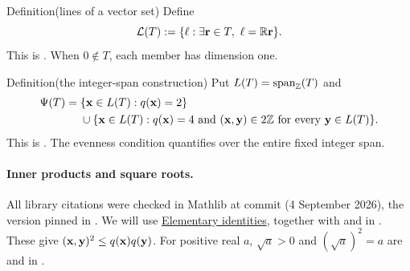 \begin{mergedproofsection}
\begin{namedresult}{Definition}{(lines of a vector set)}\label{def:312-root-lines}
Define
\[
 \cL(T):=\{\ell:\exists\Zr\in T,\ \ell=\re\Zr\}.
\]
This is . When $0\notin T$, each member
has dimension one.
\end{namedresult}

\begin{namedresult}{Definition}{(the integer-span construction)}\label{def:312-integral-roots}
\uses{}
Put $L(T)=\mathop{\mathrm{span}}\nolimits_{{\mathbb Z}}(T)$ and
\[
\begin{split}
 \Psi(T)={}&\{{\mathbf x}\in L(T):q({\mathbf x})=2\}\\
 &{}\cup\{{\mathbf x}\in L(T):q({\mathbf x})=4\text{ and }
                  ({\mathbf x},{\mathbf y})\in2{\mathbb Z}\text{ for every }{\mathbf y}\in L(T)\}.
\end{split}
\]
This is . The evenness condition
quantifies over the entire fixed integer span.
\end{namedresult}

\paragraph{Inner products and square roots.}\label{facts:312-inner}
\begingroup\raggedright
All library citations were checked in Mathlib at commit
 (4 September 2026),
the version pinned in .
We will use \hyperref[facts:inner]{Elementary identities}, together with
 and  in
.
These give $({\mathbf x},{\mathbf y})^2\leq q({\mathbf x})q({\mathbf y})$.
For positive real $a$, $\sqrt a>0$ and $(\sqrt a)^2=a$ are
 and  in
.
\par\endgroup


\end{mergedproofsection}
